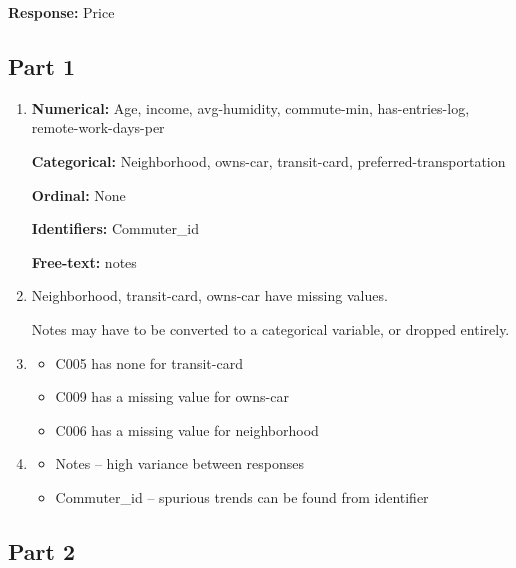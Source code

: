 \documentclass{article}
\begin{document}
\textbf{Response:} Price

\subsection{Part 1}

\begin{enumerate}
    \item \textbf{Numerical:} Age, income, avg-humidity, commute-min, has-entries-log, remote-work-days-per

    \textbf{Categorical:} Neighborhood, owns-car, transit-card, preferred-transportation

    \textbf{Ordinal:} None

    \textbf{Identifiers:} Commuter\_id

    \textbf{Free-text:} notes

    \item Neighborhood, transit-card, owns-car have missing values.

    Notes may have to be converted to a categorical variable, or dropped entirely.

    \item
    \begin{itemize}
        \item C005 has none for transit-card
        \item C009 has a missing value for owns-car
        \item C006 has a missing value for neighborhood
    \end{itemize}

    \item
    \begin{itemize}
        \item Notes -- high variance between responses
        \item Commuter\_id -- spurious trends can be found from identifier
    \end{itemize}
\end{enumerate}

\subsection{Part 2}
\end{document}
